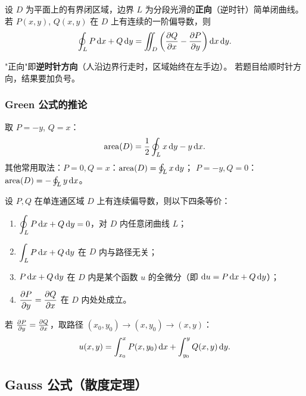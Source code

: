 \documentclass{article}
\DeclareMathOperator{\area}{area}
\begin{document}
\begin{theorem}[Green 公式]
  设 $D$ 为平面上的有界闭区域，边界 $L$ 为分段光滑的\textbf{正向}（逆时针）简单闭曲线。
  若 $P(x,y)$, $Q(x,y)$ 在 $D$ 上有连续的一阶偏导数，则
  \[
    \oint_L P \,\mathrm{d} x + Q \,\mathrm{d} y
    = \iint_D \left( \frac{\partial Q}{\partial x} - \frac{\partial P}{\partial y} \right) \mathrm{d} x\,\mathrm{d} y.
  \]
\end{theorem}

\begin{remark}[正向约定]
  "正向"即\textbf{逆时针方向}（人沿边界行走时，区域始终在左手边）。
  若题目给顺时针方向，结果要加负号。
\end{remark}

\subsubsection*{Green 公式的推论}

\begin{corollary}[面积公式]
  取 $P = -y$, $Q = x$：
  \[
    \area(D) = \frac{1}{2}\oint_L x \,\dif y - y \,\dif x.
  \]
  其他常用取法：$P = 0, Q = x$：$\area(D) = \oint_L x\,\dif y$；
  $P = -y, Q = 0$：$\area(D) = -\oint_L y\,\dif x$。
\end{corollary}

\begin{corollary}[积分与路径无关的判别]
  设 $P, Q$ 在单连通区域 $D$ 上有连续偏导数，则以下四条等价：
  \begin{enumerate}
    \item $\displaystyle\oint_L P\,\mathrm{d} x + Q\,\mathrm{d} y = 0$，对 $D$ 内任意闭曲线 $L$；
    \item $\displaystyle\int_L P\,\mathrm{d} x + Q\,\mathrm{d} y$ 在 $D$ 内与路径无关；
    \item $P\,\mathrm{d} x + Q\,\mathrm{d} y$ 在 $D$ 内是某个函数 $u$ 的全微分（即 $\mathrm{d} u =
      P\,\mathrm{d} x + Q\,\mathrm{d} y$）；
    \item $\displaystyle\frac{\partial P}{\partial y} = \frac{\partial Q}{\partial x}$ 在 $D$ 内处处成立。
  \end{enumerate}
\end{corollary}

\begin{remark}[求原函数的方法]
  若 $\frac{\partial P}{\partial y} = \frac{\partial Q}{\partial x}$，取路径 $(x_0,y_0) \to (x,y_0) \to (x,y)$：
  \[
    u(x,y) = \int_{x_0}^x P(x, y_0) \,\mathrm{d} x + \int_{y_0}^y Q(x, y) \,\mathrm{d} y.
  \]
\end{remark}

\subsection{Gauss 公式（散度定理）}
\label{sec:gauss}
\end{document}
